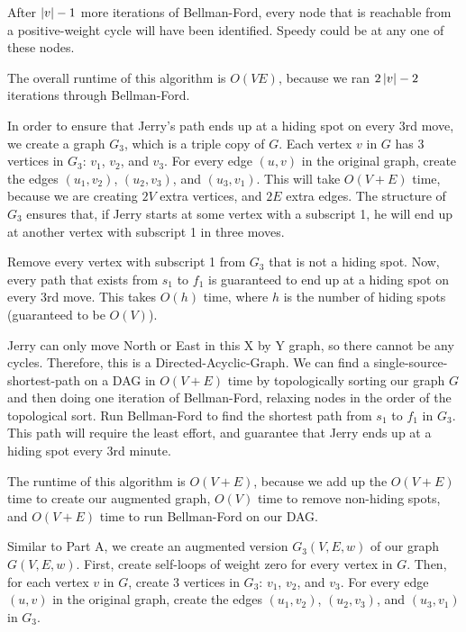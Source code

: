 \documentclass[12pt,twoside]{article}
\begin{document}
\begin{problems}
\begin{problemparts}
After $\left| v\right|-1$ more iterations of Bellman-Ford, every node that is reachable from a positive-weight cycle will have been identified. Speedy could be at any one of these nodes.

The overall runtime of this algorithm is $O(VE)$, because we ran $2\left| v\right|-2$ iterations through Bellman-Ford.

\end{problemparts}

\problem  %

\begin{problemparts}
\problempart

In order to ensure that Jerry's path ends up at a hiding spot on every 3rd move, we create a graph $G_3$, which is a triple copy of $G$. Each vertex $v$ in $G$ has 3 vertices in $G_3$: $v_1$, $v_2$, and $v_3$. For every edge $(u, v)$ in the original graph, create the edges $(u_1, v_2)$, $(u_2, v_3)$, and $(u_3, v_1)$. This will take $O(V + E)$ time, because we are creating $2V$ extra vertices, and $2E$ extra edges. The structure of $G_3$ ensures that, if Jerry starts at some vertex with a subscript 1, he will end up at another vertex with subscript 1 in three moves.

Remove every vertex with subscript 1 from $G_3$ that is not a hiding spot. Now, every path that exists from $s_1$ to $f_1$ is guaranteed to end up at a hiding spot on every 3rd move. This takes $O(h)$ time, where $h$ is the number of hiding spots (guaranteed to be $O(V)$). 

Jerry can only move North or East in this X by Y graph, so there cannot be any cycles. Therefore, this is a Directed-Acyclic-Graph. We can find a single-source-shortest-path on a DAG in $O(V+E)$ time by topologically sorting our graph $G$ and then doing one iteration of Bellman-Ford, relaxing nodes in the order of the topological sort. Run Bellman-Ford to find the shortest path from $s_1$ to $f_1$ in $G_3$. This path will require the least effort, and guarantee that Jerry ends up at a hiding spot every 3rd minute.

The runtime of this algorithm is $O(V+E)$, because we add up the $O(V+E)$ time to create our augmented graph, $O(V)$ time to remove non-hiding spots, and $O(V+E)$ time to run Bellman-Ford on our DAG.


\problempart 

Similar to Part A, we create an augmented version $G_3(V, E, w)$ of our graph $G(V, E, w)$. First, create self-loops of weight zero for every vertex in $G$. Then, for each vertex $v$ in $G$, create 3 vertices in $G_3$: $v_1$, $v_2$, and $v_3$. For every edge $(u, v)$ in the original graph, create the edges $(u_1, v_2)$, $(u_2, v_3)$, and $(u_3, v_1)$ in $G_3$. 


\end{problemparts}
\end{problems}
\end{document}
